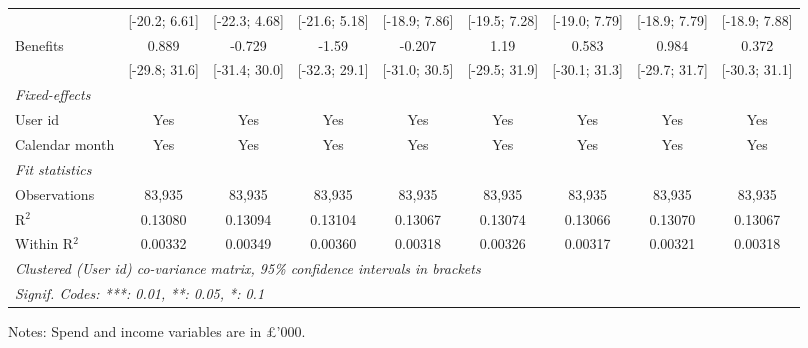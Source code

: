 \begin{table}[htbp]
\begin{threeparttable}[b]
\begin{tabular}{lcccccccc}
                                     & [-20.2; 6.61]   & [-22.3; 4.68]   & [-21.6; 5.18]   & [-18.9; 7.86]   & [-19.5; 7.28]    & [-19.0; 7.79]    & [-18.9; 7.79]    & [-18.9; 7.88]\\   
         Benefits                    & 0.889           & -0.729          & -1.59           & -0.207          & 1.19             & 0.583            & 0.984            & 0.372\\   
                                     & [-29.8; 31.6]   & [-31.4; 30.0]   & [-32.3; 29.1]   & [-31.0; 30.5]   & [-29.5; 31.9]    & [-30.1; 31.3]    & [-29.7; 31.7]    & [-30.3; 31.1]\\   
         \midrule
         \emph{Fixed-effects}\\
         User id                     & Yes             & Yes             & Yes             & Yes             & Yes              & Yes              & Yes              & Yes\\  
         Calendar month              & Yes             & Yes             & Yes             & Yes             & Yes              & Yes              & Yes              & Yes\\  
         \midrule
         \emph{Fit statistics}\\
         Observations                & 83,935          & 83,935          & 83,935          & 83,935          & 83,935           & 83,935           & 83,935           & 83,935\\  
         R$^2$                       & 0.13080         & 0.13094         & 0.13104         & 0.13067         & 0.13074          & 0.13066          & 0.13070          & 0.13067\\  
         Within R$^2$                & 0.00332         & 0.00349         & 0.00360         & 0.00318         & 0.00326          & 0.00317          & 0.00321          & 0.00318\\  
         \midrule \midrule
         \multicolumn{9}{l}{\emph{Clustered (User id) co-variance matrix, 95\% confidence intervals in brackets}}\\
         \multicolumn{9}{l}{\emph{Signif. Codes: ***: 0.01, **: 0.05, *: 0.1}}\\
      \end{tabular}
      
      \begin{tablenotes}\footnotesize
         \item Notes: Spend and income variables are in \pounds'000.
      \end{tablenotes}
   \end{threeparttable}
\end{table}


